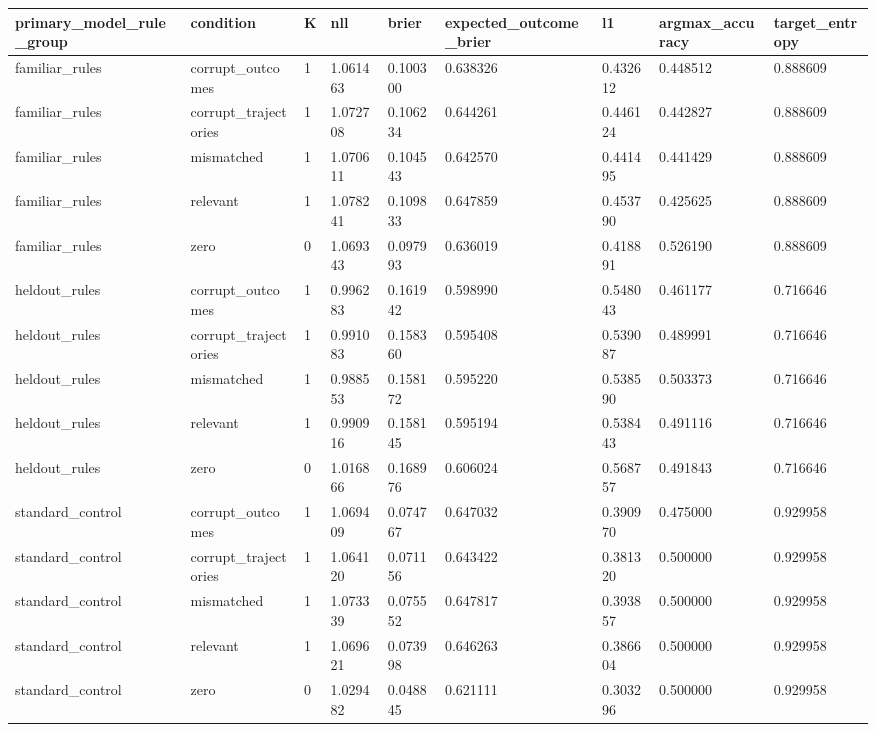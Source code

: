 \begin{tabular}{lllllllll}
\hline
primary\_model\_rule\_group & condition & K & nll & brier & expected\_outcome\_brier & l1 & argmax\_accuracy & target\_entropy \\
\hline
familiar\_rules & corrupt\_outcomes & 1 & 1.061463 & 0.100300 & 0.638326 & 0.432612 & 0.448512 & 0.888609 \\
familiar\_rules & corrupt\_trajectories & 1 & 1.072708 & 0.106234 & 0.644261 & 0.446124 & 0.442827 & 0.888609 \\
familiar\_rules & mismatched & 1 & 1.070611 & 0.104543 & 0.642570 & 0.441495 & 0.441429 & 0.888609 \\
familiar\_rules & relevant & 1 & 1.078241 & 0.109833 & 0.647859 & 0.453790 & 0.425625 & 0.888609 \\
familiar\_rules & zero & 0 & 1.069343 & 0.097993 & 0.636019 & 0.418891 & 0.526190 & 0.888609 \\
heldout\_rules & corrupt\_outcomes & 1 & 0.996283 & 0.161942 & 0.598990 & 0.548043 & 0.461177 & 0.716646 \\
heldout\_rules & corrupt\_trajectories & 1 & 0.991083 & 0.158360 & 0.595408 & 0.539087 & 0.489991 & 0.716646 \\
heldout\_rules & mismatched & 1 & 0.988553 & 0.158172 & 0.595220 & 0.538590 & 0.503373 & 0.716646 \\
heldout\_rules & relevant & 1 & 0.990916 & 0.158145 & 0.595194 & 0.538443 & 0.491116 & 0.716646 \\
heldout\_rules & zero & 0 & 1.016866 & 0.168976 & 0.606024 & 0.568757 & 0.491843 & 0.716646 \\
standard\_control & corrupt\_outcomes & 1 & 1.069409 & 0.074767 & 0.647032 & 0.390970 & 0.475000 & 0.929958 \\
standard\_control & corrupt\_trajectories & 1 & 1.064120 & 0.071156 & 0.643422 & 0.381320 & 0.500000 & 0.929958 \\
standard\_control & mismatched & 1 & 1.073339 & 0.075552 & 0.647817 & 0.393857 & 0.500000 & 0.929958 \\
standard\_control & relevant & 1 & 1.069621 & 0.073998 & 0.646263 & 0.386604 & 0.500000 & 0.929958 \\
standard\_control & zero & 0 & 1.029482 & 0.048845 & 0.621111 & 0.303296 & 0.500000 & 0.929958 \\
\hline
\end{tabular}
